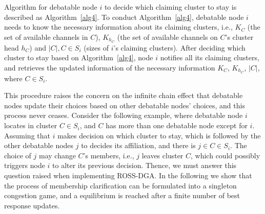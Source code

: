 \documentclass[10pt,journal,compsoc]{IEEEtran}
\theoremstyle{mytheoremstyle}
\theoremstyle{mytheoremstyle}
\theoremstyle{mytheoremstyle}
\newcommand{\ie}{i.e., }
\begin{document}
Algorithm for debatable node $i$ to decide which claiming cluster to stay is described as Algorithm~\ref{alg4}.
To conduct Algorithm~\ref{alg4}, debatable node $i$ needs to know the necessary information about its claiming clusters, \ie $K_C$ (the set of available channels in $C$), $K_{h_C}$ (the set of available channels on $C$'s cluster head $h_C$) and $|C|, C\in S_i$ (sizes of $i$'s claiming clusters).
After deciding which cluster to stay based on Algorithm~\ref{alg4}, node $i$ notifies all its claiming clusters, and retrieves the updated information of the necessary information $K_C$, $K_{h_C}$, $|C|$, where $C\in S_i$.



This procedure raises the concern on the infinite chain effect that debatable nodes update their choices based on other debatable nodes' choices, and this process never ceases.
Consider the following example, where debatable node $i$ locates in cluster $C\in S_i$, and $C$ has more than one debatable node except for $i$.
Assuming that $i$ makes decision on which cluster to stay, which is followed by the other debatable nodes $j$ to decides its affiliation, and there is $j\in C\in S_i$.
The choice of $j$ may change $C$'s members, \ie $j$ leaves cluster $C$, which could possibly triggers node $i$ to alter its previous decision.
Thence, we must answer this question raised when implementing ROSS-DGA.
In the following we show that the process of membership clarification can be formulated into a singleton congestion game, and a equilibrium is reached after a finite number of best response updates.
\end{document}
